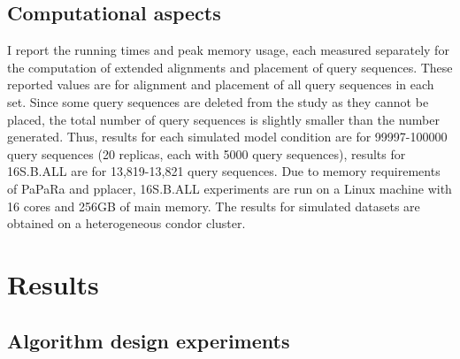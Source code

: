 
\subsection{ Computational aspects}
I report the running times and peak memory usage, each measured
separately for the computation of
extended alignments and placement of query sequences.
These reported values are for 
alignment and placement of all query sequences in each set.
Since some query sequences are deleted from the study as
they cannot be placed, the total number of
query sequences is slightly smaller than the number
generated.
Thus, results for each simulated model condition
are for 99997-100000 query sequences (20 replicas, each with 5000 query sequences),
results for 16S.B.ALL are for 13,819-13,821 query sequences.
Due to memory requirements of PaPaRa and pplacer, 16S.B.ALL experiments are
run on a Linux machine with 16 cores and 256GB of main memory. The results
for simulated datasets are obtained on a heterogeneous condor
cluster.
\section{Results}\label{sepp:results}
\subsection{Algorithm design experiments}

